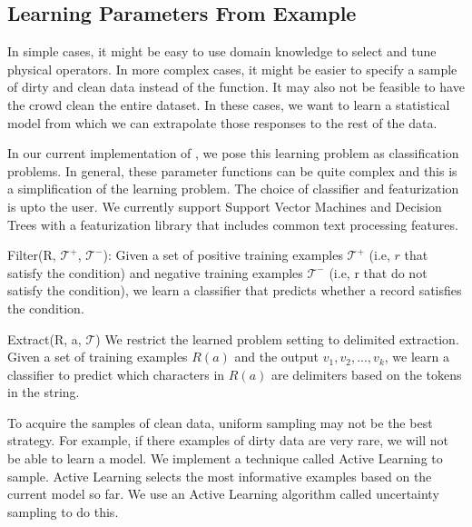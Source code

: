 


\subsection{Learning Parameters From Example}
In simple cases, it might be easy to use domain knowledge to select and tune physical operators. 
In more complex cases, it might be easier to specify a sample of dirty and clean data instead of the function.
It may also not be feasible to have the crowd clean the entire dataset.
In these cases, we want to learn a statistical model from which we can extrapolate those responses to the rest 
of the data.

In our current implementation of \projx, we pose this learning problem as classification problems.
In general, these parameter functions can be quite complex and this is a simplification of the learning problem.
The choice of classifier and featurization is upto the user. 
We currently support Support Vector Machines and Decision Trees with a featurization library that includes common text processing features.

\vspace{0.5em}

\noindent \textsf{Filter(R, $\mathcal{T}^+$, $\mathcal{T}^-$)}: Given a set of positive training examples $\mathcal{T}^+$ (i.e, $r$ that satisfy the condition) and
negative training examples $\mathcal{T}^-$ (i.e, r that do not satisfy the condition), we learn a classifier that predicts whether a record satisfies the condition. 

\vspace{0.5em}

\noindent \textsf{Extract(R, a, $\mathcal{T}$)} We restrict the learned problem setting to delimited extraction. Given a set of training examples $R(a)$ and the output $v_1,v_2,...,v_k$, we learn a classifier to predict which characters in $R(a)$ are delimiters based on the tokens in the string.

\vspace{1em}

To acquire the samples of clean data, uniform sampling may not be the best strategy.
For example, if there examples of dirty data are very rare, we will not be able to learn a model.
We implement a technique called Active Learning to sample.
Active Learning selects the most informative examples based on the current model so far.
We use an Active Learning algorithm called uncertainty sampling to do this.




